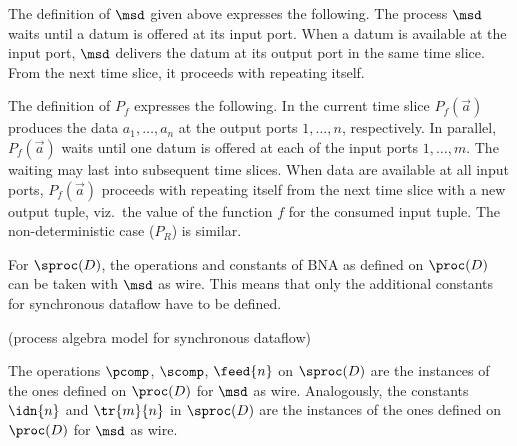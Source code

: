 \documentclass[fleqn]{llncs}
\begin{document}
The definition of $\msd$ given above expresses the following.
The process $\msd$ waits until a datum is offered at its input port.
When a datum is available at the input port, $\msd$ delivers the datum
at its output port in the same time slice.
{From} the next time slice, it proceeds with repeating itself.

\noindent
The definition of $P_f$ expresses the following.
In the current time slice $P_f(\vec{a})$ produces the data
$a_1,\dots,a_n$ at the output ports $1,\dots,n$, respectively.
In parallel, $P_f(\vec{a})$ waits until one datum is offered at each of
the input ports $1,\dots,m$.
The waiting may last into subsequent time slices.
When data are available at all input ports, $P_f(\vec{a})$ proceeds with
repeating itself from the next time slice with a new output tuple, viz.\
the value of the function $f$ for the consumed input tuple.
The non-deterministic case ($P_R$) is similar.

For $\sproc(D)$, the operations and constants of BNA as defined on
$\proc(D)$ can be taken with $\msd$ as wire.
This means that only the additional constants for synchronous dataflow
have to be defined.

\bdfn (process algebra model for synchronous dataflow)
\label{dfn-sproc}

\noindent
The operations $\pcomp$, $\scomp$, $\feed{n}$ on $\sproc(D)$ are the
instances of the ones defined on $\proc(D)$ for $\msd$ as wire.
Analogously, the constants $\idn{n}$ and $\tr{m}{n}$ in $\sproc(D)$ are
the instances of the ones defined on $\proc(D)$ for $\msd$ as wire.
\end{document}

